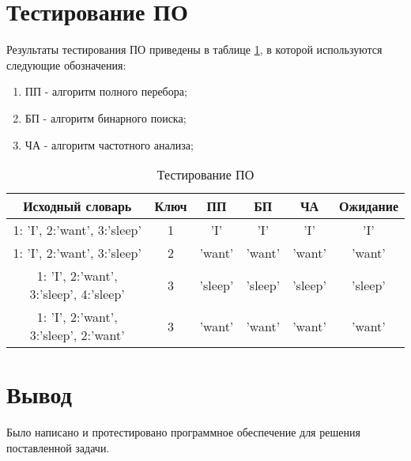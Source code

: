 \section{Тестирование ПО}
Результаты тестирования ПО приведены в таблице \ref{table:testing}, в которой используются следующие обозначения:
\begin{enumerate}
	\item ПП - алгоритм полного перебора;
	\item БП - алгоритм бинарного поиска;
	\item ЧА - алгоритм частотного анализа;
\end{enumerate} 

\begin{table}[H]
	\captionsetup{singlelinecheck = false, justification=raggedright}
	\caption{Тестирование ПО}
	\renewcommand{\arraystretch}{2}
	\begin{center}
		\begin{tabular}{|c|c|c|c|c|c|}
			\hline
			Исходный словарь &  Ключ & ПП & БП & ЧА & Ожидание \\ \hline
			1: 'I', 2:'want', 3:'sleep' & 1 & 'I' & 'I' &'I'& 'I'\\
			1: 'I', 2:'want', 3:'sleep' & 2 & 'want' & 'want' &'want'& 'want'\\
			1: 'I', 2:'want', 3:'sleep', 4:'sleep'& 3 & 'sleep' & 'sleep' &'sleep'& 'sleep'\\
			1: 'I', 2:'want', 3:'sleep', 2:'want'& 3 & 'want' & 'want' &'want'& 'want'\\
			\hline
		\end{tabular}
	\end{center}
	\label{table:testing}
\end{table}

\section{Вывод}
Было написано и протестировано программное обеспечение для решения поставленной задачи.